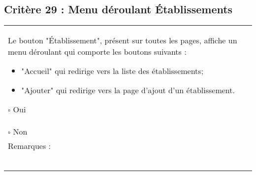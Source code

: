   		
  			\subsection*{Critère 29 : Menu déroulant Établissements}
	
	\begin{center}
    	 		\begin{tabular}[h]{|p{}|}
			\hline
				Le bouton "Établissement", présent sur toutes les pages, affiche un menu déroulant qui comporte les boutons suivants : 
				\begin{itemize}
					\item "Accueil" qui redirige vers la liste des établissements;
					\item "Ajouter" qui redirige vers la page d'ajout d'un établissement.
				\end{itemize}
				$\square$ Oui  \\ $\square$ Non \\\hline Remarques : \\ ~\\
			 \\\hline
     		\end{tabular}
  		\end{center}
  		
  		
  	